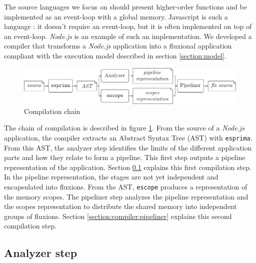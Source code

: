 The source languages we focus on should present higher-order functions and be implemented as an event-loop with a global memory.
Javascript is such a language : it doesn't require an event-loop, but it is often implemented on top of an event-loop.
\textit{Node.js} is an example of such an implementation.
We developed a compiler that transforms a \textit{Node.js} application into a fluxional application compliant with the execution model described in section \ref{section:model}.

\begin{figure}[h!]
\begin{center}
  \includegraphics[width=\linewidth]{resources/compiler-stream.pdf}
  \caption{Compilation chain}
  \label{fig:compilation}
\end{center}
\end{figure}

The chain of compilation is described in figure \ref{fig:compilation}.
From the source of a \textit{Node.js} application, the compiler extracts an Abstract Syntax Tree (AST) with \texttt{esprima}.
From this AST, the analyzer step identifies the limits of the different application parts and how they relate to form a pipeline.
This first step outputs a pipeline representation of the application.
Section \ref{section:compiler:analyzer} explains this first compilation step.
In the pipeline representation, the stages are not yet independent and encapsulated into fluxions.
From the AST, \texttt{escope} produces a representation of the memory scopes.
The pipeliner step analyzes the pipeline representation and the scopes representation to distribute the shared memory into independent groups of fluxions.
Section \ref{section:compiler:pipeliner} explains this second compilation step.


\subsection{Analyzer step} \label{section:compiler:analyzer}

